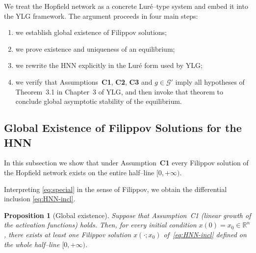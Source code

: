 \documentclass[journal]{IEEEtran}
\newtheorem{proposition}{Proposition}
\begin{document}
We treat the Hopfield network as a concrete Lur\'e–type system and
embed it into the YLG framework.  The argument proceeds in four main
steps:
\begin{enumerate}
  \item we establish global existence of Filippov solutions;
  \item we prove existence and uniqueness of an equilibrium;
  \item we rewrite the HNN explicitly in the Lur\'e form used by YLG;
  \item we verify that Assumptions~\textbf{C1}, \textbf{C2},
        \textbf{C3} and $g\in\mathcal G'$ imply all hypotheses of
        Theorem~3.1 in Chapter~3 of YLG, and then invoke that theorem
        to conclude global asymptotic stability of the equilibrium.
\end{enumerate}

\subsection{Global Existence of Filippov Solutions for the HNN}

In this subsection we show that under Assumption~\textbf{C1} every
Filippov solution of the Hopfield network exists on the entire
half–line $[0,+\infty)$.

Interpreting \eqref{eq:special} in the sense of Filippov, we obtain
the differential inclusion \eqref{eq:HNN-incl}.

\begin{proposition}[Global existence]
\label{prop:global-existence}
Suppose that Assumption~C1 (linear growth of the activation functions)
holds. Then, for every initial condition $x(0)=x_0\in\mathbb{R}^n$,
there exists at least one Filippov solution $x(\cdot;x_0)$
of~\eqref{eq:HNN-incl} defined on the whole half–line $[0,+\infty)$.
\end{proposition}
\end{document}
